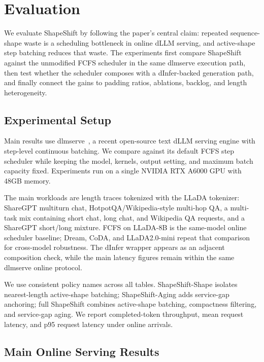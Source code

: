\documentclass[letterpaper]{article} \usepackage[submission]{aaai2027} \usepackage[hyphens]{url} \usepackage{graphicx} \usepackage{subcaption} \urlstyle{rm} \def\UrlFont{\rm} \usepackage{natbib} \usepackage{amsmath} \usepackage{amssymb} \usepackage{booktabs} \usepackage{multirow} \usepackage{algorithm} \usepackage{algorithmic}
\begin{document}
\section{Evaluation}

We evaluate ShapeShift by following the paper's central claim: repeated sequence-shape waste is a scheduling bottleneck in online dLLM serving, and active-shape step batching reduces that waste. The experiments first compare ShapeShift against the unmodified FCFS scheduler in the same dlmserve execution path, then test whether the scheduler composes with a dInfer-backed generation path, and finally connect the gains to padding ratios, ablations, backlog, and length heterogeneity.

\subsection{Experimental Setup}

Main results use dlmserve~\cite{dlmserve2026}, a recent open-source text dLLM serving engine with step-level continuous batching. We compare against its default FCFS step scheduler while keeping the model, kernels, output setting, and maximum batch capacity fixed. Experiments run on a single NVIDIA RTX A6000 GPU with 48GB memory.

The main workloads are length traces tokenized with the LLaDA tokenizer: ShareGPT multiturn chat, HotpotQA/Wikipedia-style multi-hop QA, a multi-task mix containing short chat, long chat, and Wikipedia QA requests, and a ShareGPT short/long mixture. FCFS on LLaDA-8B is the same-model online scheduler baseline; Dream, CoDA, and LLaDA2.0-mini repeat that comparison for cross-model robustness. The dInfer wrapper appears as an adjacent composition check, while the main latency figures remain within the same dlmserve online protocol.

We use consistent policy names across all tables. ShapeShift-Shape isolates nearest-length active-shape batching; ShapeShift-Aging adds service-gap anchoring; full ShapeShift combines active-shape batching, compactness filtering, and service-gap aging. We report completed-token throughput, mean request latency, and p95 request latency under online arrivals.

\subsection{Main Online Serving Results}
\end{document}
